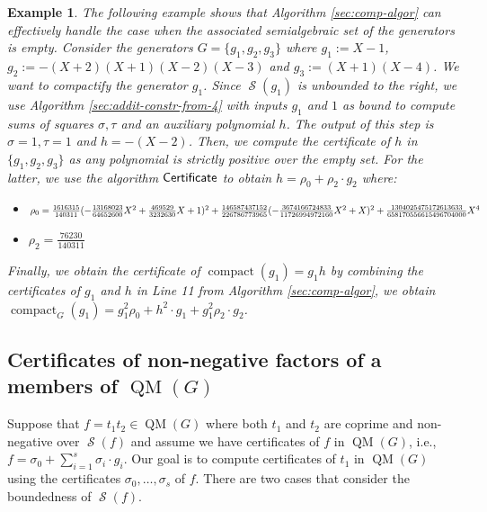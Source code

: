\documentclass[preprint,12pt,authoryear]{elsarticle}
\newtheorem{example}[theorem]{Example}
\newenvironment{example1}
  {\begin{example}\rm}
  {\end{example}}
\DeclareMathOperator{\quadmod}{QM}
\DeclareMathOperator{\semialgebraic}{\mathcal{S}}
\DeclareMathOperator{\compact}{compact}
\DeclareMathOperator{\algPutinar}{\sf Certificate}
\begin{document}
\begin{example1}
  \th\label{sec:comp-algor-3} The following example shows that Algorithm
  \ref{sec:comp-algor} can effectively handle the case when the associated
  semialgebraic set of the generators is empty. Consider the generators
  $G = \{g_1, g_2, g_3\}$ where $g_1 := X - 1$,
  $g_2 := -(X + 2) (X + 1) (X - 2) (X - 3)$ and $g_3 := (X + 1) (X - 4)$. We
  want to compactify the generator $g_1$. Since $\semialgebraic(g_1)$ is
  unbounded to the right, we use Algorithm \ref{sec:addit-constr-from-4} with
  inputs $g_1$ and $1$ as bound to compute sums of squares $\sigma, \tau$ and an
  auxiliary polynomial $h$. The output of this step is $\sigma = 1, \tau = 1$ and
  $h = -(X - 2)$.  Then, we compute the certificate of $h$ in
  $\{g_1, g_2, g_3\}$ as any polynomial is strictly positive over the empty
  set. For the latter, we use the algorithm $\algPutinar$ to obtain
  $h = \rho_0 + \rho_2 \cdot g_2$ where:

  \begin{itemize}
  \item[] $\rho_0 =
    \frac{1616315}{140311}(-\frac{13168023}{64652600}X^{2}
    +\frac{469529}{3232630}X+1)^2\\
    +\frac{146587437152}{226786773965}
    (-\frac{3674166724833}{11726994972160}X^{2}+X)^2 
    +\frac{1304025475172613633}{658170556615496704000}X^{4}$
  \item[] $\rho_2 = \frac{76230}{140311}$
  \end{itemize}

  Finally, we obtain the certificate of $\compact(g_1) = g_1 h$ by combining the
  certificates of $g_1$ and $h$ in Line 11 from Algorithm \ref{sec:comp-algor},
  we obtain
  $\compact_G(g_1) = g_1^{2} \rho_0 + h^{2} \cdot g_1 + g_1^{2} \rho_2 \cdot
  g_2$.
\end{example1}



 \subsection{Certificates of non-negative factors of a members of $\quadmod(G)$}
\label{sec:cert-non-neg-cert}

Suppose that $f = t_1 t_2 \in \quadmod(G)$ where both $t_1$ and $t_2$ are
coprime and non-negative over $\semialgebraic(f)$ and assume we have
certificates of $f$ in $\quadmod(G)$, i.e.,
$f = \sigma_0 + \sum_{i=1}^{s}{\sigma_i \cdot g_i}$. Our goal is to compute
certificates of $t_1$ in $\quadmod(G)$ using the certificates
$\sigma_0, \dots, \sigma_s$ of $f$. There are two cases that consider the
boundedness of $\semialgebraic(f)$.
\end{document}
